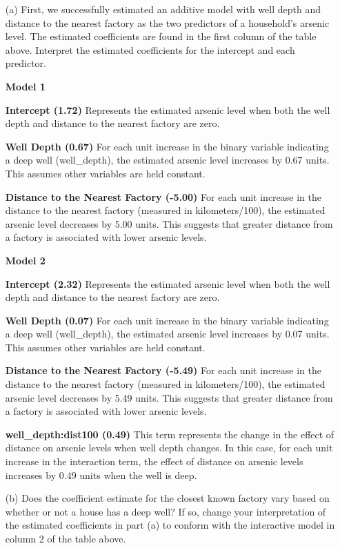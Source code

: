 \documentclass[12pt,letterpaper]{article}
\begin{document}
\begin{enumerate}
	
	\item [(a)] First, we successfully estimated an additive model with well depth and distance to the nearest factory as the two predictors of a household’s arsenic level. The estimated coefficients are found in the first column of the table above. Interpret the estimated coefficients for the intercept and each predictor.
\vspace{.25cm}	
	
\textbf{Model 1}\
	
	\textbf{Intercept (1.72)}\: Represents the estimated arsenic level when both the well depth and distance to the nearest factory are zero.
	
	\textbf{Well Depth (0.67)}\: For each unit increase in the binary variable indicating a deep well (well\_depth), the estimated arsenic level increases by 0.67 units. This assumes other variables are held constant.
	
	\textbf{Distance to the Nearest Factory (-5.00)}\: For each unit increase in the distance to the nearest factory (measured in kilometers/100), the estimated arsenic level decreases by 5.00 units. This suggests that greater distance from a factory is associated with lower arsenic levels.

\textbf{Model 2}\
	
	\textbf{Intercept (2.32)}\: Represents the estimated arsenic level when both the well depth and distance to the nearest factory are zero.

	\textbf{Well Depth (0.07)}\: For each unit increase in the binary variable indicating a deep well (well\_depth), the estimated arsenic level increases by 0.07 units. This assumes other variables are held constant.

	\textbf{Distance to the Nearest Factory (-5.49)}\: For each unit increase in the distance to the nearest factory (measured in kilometers/100), the estimated arsenic level decreases by 5.49 units. This suggests that greater distance from a factory is associated with lower arsenic levels.	

	\textbf{well\_depth:dist100 (0.49)}\: This term represents the change in the effect of distance on arsenic levels when well depth changes. In this case, for each unit increase in the interaction term, the effect of distance on arsenic levels increases by 0.49 units when the well is deep.

\vspace{1cm}	
	\item [(b)] Does the coefficient estimate for the closest known factory vary based on whether or not a house has a deep well? If so, change your interpretation of the estimated coefficients in part (a) to conform with the interactive model in column 2 of the table above. 
	

\end{enumerate}
\end{document}
